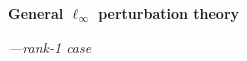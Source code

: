 \documentclass[compress,
mathserif,wide,%
]{beamer}
\begin{document}
\begin{frame}[plain]
\vfill
\centering
{\large \bf General $\ell_{\infty}$ perturbation theory}

{\hfill \em ---rank-1 case}
\vfill
\end{frame}

%
%	
%
%	
%
%
%
%
%	
%
\end{document}
